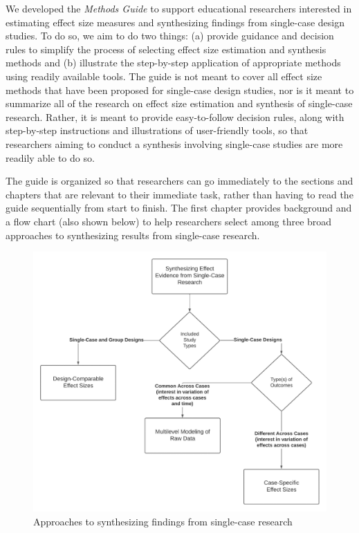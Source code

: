 \documentclass[
]{book}
\begin{document}
We developed the \emph{Methods Guide} to support educational researchers interested in estimating effect size measures and synthesizing findings from single-case design studies.
To do so, we aim to do two things: (a) provide guidance and decision rules to simplify the process of selecting effect size estimation and synthesis methods and (b) illustrate the step-by-step application of appropriate methods using readily available tools.
The guide is not meant to cover all effect size methods that have been proposed for single-case design studies, nor is it meant to summarize all of the research on effect size estimation and synthesis of single-case research.
Rather, it is meant to provide easy-to-follow decision rules, along with step-by-step instructions and illustrations of user-friendly tools, so that researchers aiming to conduct a synthesis involving single-case studies are more readily able to do so.

The guide is organized so that researchers can go immediately to the sections and chapters that are relevant to their immediate task, rather than having to read the guide sequentially from start to finish.
The first chapter provides background and a flow chart (also shown below) to help researchers select among three broad approaches to synthesizing results from single-case research.

\begin{figure}
\includegraphics[width=1\linewidth]{images/flowchart_SynthesizingResults} \caption{Approaches to synthesizing findings from single-case research}\label{fig:unnamed-chunk-2}
\end{figure}
\end{document}
